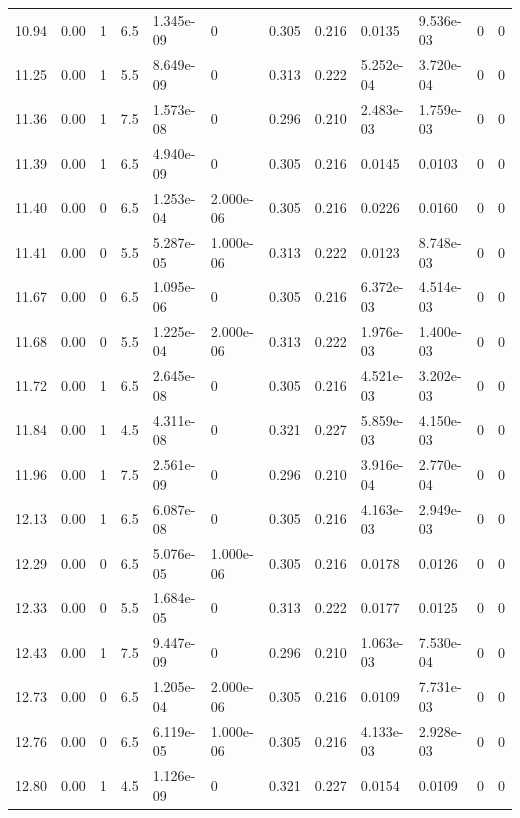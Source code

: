 \documentclass[preview]{standalone}
\begin{document}
{{{{\begin{tabular}{L{1.2cm}C{1.2cm} C{0.3cm}C{0.5cm} C{1.4cm}C{1.4cm} C{1.4cm}C{1.4cm} C{1.6cm}C{1.6cm} C{1.6cm}C{1.6cm}}
  10.94  &  0.00  & 1     & 6.5 &  1.345e-09  & 0  &  0.305&   0.216& 0.0135 & 9.536e-03   &  0 & 0  \\ 
  11.25  &  0.00  & 1     & 5.5 &  8.649e-09  & 0  &  0.313&   0.222& 5.252e-04 & 3.720e-04   &  0 & 0  \\ 
  11.36  &  0.00  & 1     & 7.5 &  1.573e-08  & 0  &  0.296&   0.210& 2.483e-03 & 1.759e-03   &  0 & 0  \\ 
  11.39  &  0.00  & 1     & 6.5 &  4.940e-09  & 0  &  0.305&   0.216& 0.0145 & 0.0103   &  0 & 0  \\ 
  11.40  &  0.00  & 0     & 6.5 &  1.253e-04  & 2.000e-06  &  0.305&   0.216& 0.0226 & 0.0160   &  0 & 0  \\ 
  11.41  &  0.00  & 0     & 5.5 &  5.287e-05  & 1.000e-06  &  0.313&   0.222& 0.0123 & 8.748e-03   &  0 & 0  \\ 
  11.67  &  0.00  & 0     & 6.5 &  1.095e-06  & 0  &  0.305&   0.216& 6.372e-03 & 4.514e-03   &  0 & 0  \\ 
  11.68  &  0.00  & 0     & 5.5 &  1.225e-04  & 2.000e-06  &  0.313&   0.222& 1.976e-03 & 1.400e-03   &  0 & 0  \\ 
  11.72  &  0.00  & 1     & 6.5 &  2.645e-08  & 0  &  0.305&   0.216& 4.521e-03 & 3.202e-03   &  0 & 0  \\ 
  11.84  &  0.00  & 1     & 4.5 &  4.311e-08  & 0  &  0.321&   0.227& 5.859e-03 & 4.150e-03   &  0 & 0  \\ 
  11.96  &  0.00  & 1     & 7.5 &  2.561e-09  & 0  &  0.296&   0.210& 3.916e-04 & 2.770e-04   &  0 & 0  \\ 
  12.13  &  0.00  & 1     & 6.5 &  6.087e-08  & 0  &  0.305&   0.216& 4.163e-03 & 2.949e-03   &  0 & 0  \\ 
  12.29  &  0.00  & 0     & 6.5 &  5.076e-05  & 1.000e-06  &  0.305&   0.216& 0.0178 & 0.0126   &  0 & 0  \\ 
  12.33  &  0.00  & 0     & 5.5 &  1.684e-05  & 0  &  0.313&   0.222& 0.0177 & 0.0125   &  0 & 0  \\ 
  12.43  &  0.00  & 1     & 7.5 &  9.447e-09  & 0  &  0.296&   0.210& 1.063e-03 & 7.530e-04   &  0 & 0  \\ 
  12.73  &  0.00  & 0     & 6.5 &  1.205e-04  & 2.000e-06  &  0.305&   0.216& 0.0109 & 7.731e-03   &  0 & 0  \\ 
  12.76  &  0.00  & 0     & 6.5 &  6.119e-05  & 1.000e-06  &  0.305&   0.216& 4.133e-03 & 2.928e-03   &  0 & 0  \\ 
  12.80  &  0.00  & 1     & 4.5 &  1.126e-09  & 0  &  0.321&   0.227& 0.0154 & 0.0109   &  0 & 0  \\ 

\end{tabular}}}}}
\end{document}
